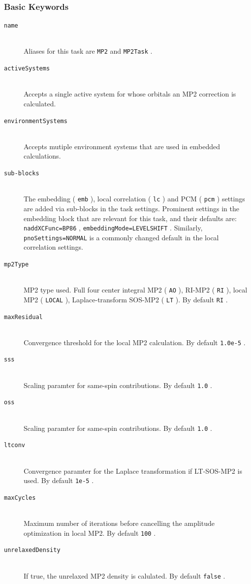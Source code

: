 \documentclass[bibliography=totocnumbered,a4paper,10pt,oneside]{scrbook}
\newcommand{\ttt}[1]{%
  \begingroup\setlength{\fboxsep}{1pt}%
  \colorbox{serenity-green!30}{\texttt{\hspace*{2pt}\vphantom{(g}#1\hspace*{2pt}}}%
  \endgroup
}
\begin{document}
\subsubsection{Basic Keywords}
\begin{description}
	\item [\texttt{name}]\hfill \\
	Aliases for this task are \ttt{MP2} and \ttt{MP2Task}.
	\item [\texttt{activeSystems}]\hfill \\
	Accepts a single active system for whose orbitals an MP2 correction is calculated.
	\item [\texttt{environmentSystems}]\hfill \\
	Accepts mutiple environment systems that are used in embedded calculations.
	\item [\texttt{sub-blocks}]\hfill \\
	The embedding (\ttt{emb}), local correlation (\ttt{lc}) and PCM (\ttt{pcm}) settings are added via sub-blocks in the task settings.
	Prominent settings in the embedding block that are relevant for this task, and their defaults are:
	\ttt{naddXCFunc=BP86}, \ttt{embeddingMode=LEVELSHIFT}.
	Similarly, \ttt{pnoSettings=NORMAL} is a commonly changed default in the local correlation settings.
	\item [\texttt{mp2Type}] \hfill \\ 
	MP2 type used. Full four center integral MP2 (\ttt{AO}), RI-MP2 (\ttt{RI}), local MP2 (\ttt{LOCAL}), Laplace-transform SOS-MP2 (\ttt{LT}). By default \ttt{RI}.
  \item[\texttt{maxResidual}]\hfill \\
	Convergence threshold for the local MP2 calculation. By default \ttt{1.0e-5}.
  \item[\texttt{sss}]\hfill \\
	Scaling paramter for same-spin contributions. By default \ttt{1.0}.
  \item[\texttt{oss}]\hfill \\
	Scaling paramter for same-spin contributions. By default \ttt{1.0}.
  \item[\texttt{ltconv}]\hfill \\
	Convergence paramter for the Laplace transformation if LT-SOS-MP2 is used. By default \ttt{1e-5}.
  \item[\texttt{maxCycles}]\hfill \\
  Maximum number of iterations before cancelling the amplitude optimization in local MP2. By default \ttt{100}.
  \item[\texttt{unrelaxedDensity}]\hfill \\
  If true, the unrelaxed MP2 density is calulated. By default \ttt{false}. 
\end{description}
\end{document}
